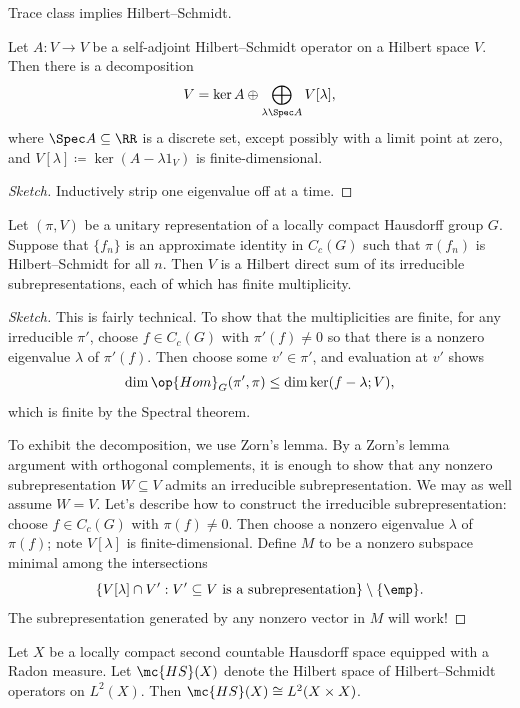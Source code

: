 \documentclass{article}
\begin{document}
\begin{remark}
	Trace class implies Hilbert--Schmidt.
\end{remark}
\begin{theorem}[Spectral]
	Let $A\colon V\to V$ be a self-adjoint Hilbert--Schmidt operator on a Hilbert space $V$. Then there is a decomposition
	\[V=\ker A\oplus\bigoplus_{\lambda\Spec A}V[\lambda],\]
	where $\Spec A\subseteq\RR$ is a discrete set, except possibly with a limit point at zero, and $V[\lambda]\coloneqq\ker(A-\lambda1_V)$ is finite-dimensional.
\end{theorem}
\begin{proof}[Sketch]
	Inductively strip one eigenvalue off at a time.
\end{proof}
\begin{corollary}
	Let $(\pi,V)$ be a unitary representation of a locally compact Hausdorff group $G$. Suppose that $\{f_n\}$ is an approximate identity in $C_c(G)$ such that $\pi(f_n)$ is Hilbert--Schmidt for all $n$. Then $V$ is a Hilbert direct sum of its irreducible subrepresentations, each of which has finite multiplicity.
\end{corollary}
\begin{proof}[Sketch]
	This is fairly technical. To show that the multiplicities are finite, for any irreducible $\pi'$, choose $f\in C_c(G)$ with $\pi'(f)\ne0$ so that there is a nonzero eigenvalue $\lambda$ of $\pi'(f)$. Then choose some $v'\in\pi'$, and evaluation at $v'$ shows
	\[\dim\op{Hom}_G(\pi',\pi)\le\dim\ker(f-\lambda;V),\]
	which is finite by the Spectral theorem.

	To exhibit the decomposition, we use Zorn's lemma. By a Zorn's lemma argument with orthogonal complements, it is enough to show that any nonzero subrepresentation $W\subseteq V$ admits an irreducible subrepresentation. We may as well assume $W=V$. Let's describe how to construct the irreducible subrepresentation: choose $f\in C_c(G)$ with $\pi(f)\ne0$. Then choose a nonzero eigenvalue $\lambda$ of $\pi(f)$; note $V[\lambda]$ is finite-dimensional. Define $M$ to be a nonzero subspace minimal among the intersections
	\[\{V[\lambda]\cap V':V'\subseteq V\text{ is a subrepresentation}\}\setminus\{\emp\}.\]
	The subrepresentation generated by any nonzero vector in $M$ will work!
\end{proof}
\begin{proposition}
	Let $X$ be a locally compact second countable Hausdorff space equipped with a Radon measure. Let $\mc{HS}(X)$ denote the Hilbert space of Hilbert--Schmidt operators on $L^2(X)$. Then $\mc{HS}(X)\cong L^2(X\times X)$.
\end{proposition}
\end{document}

